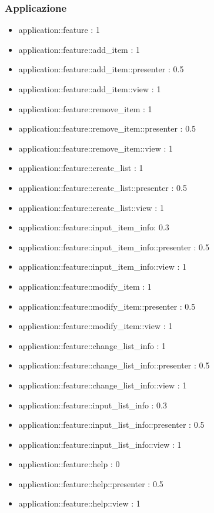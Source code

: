 \subsubsection{Applicazione}

\begin{itemize}

\item application::feature : 1
\item application::feature::add\_item : 1
\item application::feature::add\_item::presenter : 0.5
\item application::feature::add\_item::view : 1
\item application::feature::remove\_item : 1
\item application::feature::remove\_item::presenter : 0.5
\item application::feature::remove\_item::view : 1
\item application::feature::create\_list : 1
\item application::feature::create\_list::presenter : 0.5
\item application::feature::create\_list::view : 1
\item application::feature::input\_item\_info: 0.3
\item application::feature::input\_item\_info::presenter : 0.5
\item application::feature::input\_item\_info::view : 1
\item application::feature::modify\_item : 1
\item application::feature::modify\_item::presenter : 0.5
\item application::feature::modify\_item::view : 1
\item application::feature::change\_list\_info : 1
\item application::feature::change\_list\_info::presenter : 0.5
\item application::feature::change\_list\_info::view : 1
\item application::feature::input\_list\_info : 0.3
\item application::feature::input\_list\_info::presenter : 0.5
\item application::feature::input\_list\_info::view : 1
\item application::feature::help : 0
\item application::feature::help::presenter : 0.5
\item application::feature::help::view : 1

\end{itemize}
